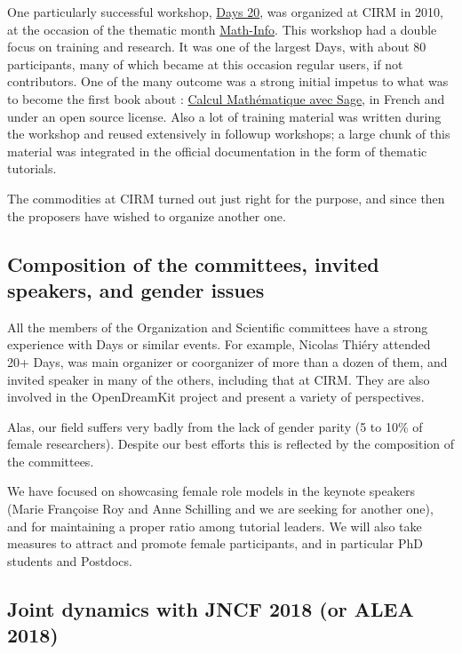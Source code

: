 \documentclass[12pt]{amsart}
\begin{document}
One particularly successful workshop,
\href{https://www.lirmm.fr/arith/wiki/MathInfo2010/SageDays}{\Sage
  Days 20}, was organized at CIRM in 2010, at the occasion of the
thematic month
\href{https://www.lirmm.fr/arith/wiki/MathInfo2010/}{Math-Info}. This
workshop had a double focus on training and research. It was one of
the largest \Sage Days, with about 80 participants, many of which
became at this occasion regular \Sage users, if not contributors. One
of the many outcome was a strong initial impetus to what was to become
the first book about \Sage: \href{http://sagebook.gforge.inria.fr/}{Calcul Mathématique avec
Sage}, in French and under an open
source license. Also a lot of training material was written during the
workshop and reused extensively in followup workshops; a large chunk
of this material was integrated in the \Sage official documentation in
the form of thematic tutorials.

The commodities at CIRM turned out just right for the purpose, and
since then the proposers have wished to organize another one.

\subsection{Composition of the committees, invited speakers, and gender issues}

All the members of the Organization and Scientific committees have a
strong experience with \Sage Days or similar events. For example,
Nicolas Thiéry attended 20+ \Sage Days, was main organizer or
coorganizer of more than a dozen of them, and invited speaker in many
of the others, including that at CIRM. They are also involved in the
OpenDreamKit project and present a variety of perspectives.

Alas, our field suffers very badly from the lack of gender parity (5
to 10\% of female researchers). Despite our best efforts this is reflected by the
composition of the committees.

We have focused on showcasing female role models in the keynote
speakers (Marie Françoise Roy and Anne Schilling and we are seeking
for another one), and for maintaining a proper ratio among tutorial
leaders. We will also take measures to attract and promote female
participants, and in particular PhD students and Postdocs.

\subsection{Joint dynamics with JNCF 2018 (or ALEA 2018)}
\end{document}
